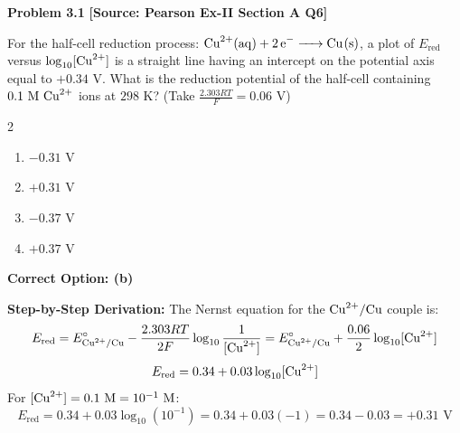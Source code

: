 \begin{problembox}
\textbf{Problem 3.1} \hfill \textbf{[Source: Pearson Ex-II Section A Q6]}

For the half-cell reduction process: $\ce{Cu^2+(aq) + 2e^- -> Cu(s)}$, a plot of $E_{\text{red}}$ versus $\log_{10}[\ce{Cu^2+}]$ is a straight line having an intercept on the potential axis equal to $+0.34\text{ V}$. What is the reduction potential of the half-cell containing $0.1\text{ M } \ce{Cu^2+}$ ions at $298\text{ K}$? (Take $\frac{2.303 RT}{F} = 0.06\text{ V}$)
\begin{multicols}{2}
\begin{enumerate}[label=(\alph*)]
    \item $-0.31\text{ V}$
    \item $+0.31\text{ V}$
    \item $-0.37\text{ V}$
    \item $+0.37\text{ V}$
\end{enumerate}
\end{multicols}
\end{problembox}
\begin{solution}
\textbf{Correct Option: (b)}

\textbf{Step-by-Step Derivation:}
The Nernst equation for the $\ce{Cu^2+/Cu}$ couple is:
\begin{equation*}
    E_{\text{red}} = E^\circ_{\ce{Cu^2+/Cu}} - \frac{2.303 RT}{2F} \log_{10} \frac{1}{[\ce{Cu^2+}]} = E^\circ_{\ce{Cu^2+/Cu}} + \frac{0.06}{2} \log_{10}[\ce{Cu^2+}]
\end{equation*}
\begin{equation*}
    E_{\text{red}} = 0.34 + 0.03 \log_{10}[\ce{Cu^2+}]
\end{equation*}
For $[\ce{Cu^2+}] = 0.1\text{ M} = 10^{-1}\text{ M}$:
\begin{equation*}
    E_{\text{red}} = 0.34 + 0.03 \log_{10}(10^{-1}) = 0.34 + 0.03(-1) = 0.34 - 0.03 = +0.31\text{ V}
\end{equation*}
\end{solution}

